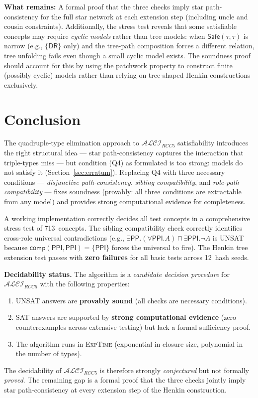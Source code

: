 \documentclass[a4paper,11pt]{article}
\theoremstyle{definition}
\newcommand{\ALCIRCC}[1]{\ensuremath{\mathcal{ALCI}_{\mathit{RCC#1}}}}
\newcommand{\DR}{\ensuremath{\mathsf{DR}}}
\newcommand{\PP}{\ensuremath{\mathsf{PP}}}
\newcommand{\PPI}{\ensuremath{\mathsf{PPI}}}
\newcommand{\comp}{\ensuremath{\mathsf{comp}}}
\newcommand{\Safe}{\ensuremath{\mathsf{Safe}}}
\newcommand{\EXPTIME}{\textsc{ExpTime}}
\begin{document}
\noindent\textbf{What remains:}\; A formal proof that the
three checks imply star path-consistency for the full star
network at each extension step (including uncle and cousin
constraints).  Additionally, the stress test reveals that
some satisfiable concepts may require \emph{cyclic models}
rather than tree models: when $\Safe(\tau, \tau)$ is narrow
(e.g., $\{\DR\}$ only) and the tree-path composition forces
a different relation, tree unfolding fails even though a small
cyclic model exists.  The soundness proof should account for
this by using the patchwork property to construct finite
(possibly cyclic) models rather than relying on tree-shaped
Henkin constructions exclusively.


\section{Conclusion}
\label{sec:conclusion}

The quadruple-type elimination approach to $\ALCIRCC{5}$
satisfiability introduces the right structural idea ---
star path-consistency captures the interaction that triple-types
miss --- but condition (Q4) as formulated is too strong:
models do not satisfy it (Section~\ref{sec:erratum}).
Replacing Q4 with three necessary conditions ---
\emph{disjunctive path-consistency}, \emph{sibling compatibility},
and \emph{role-path compatibility} --- fixes soundness
(provably: all three conditions are extractable from any model)
and provides strong computational evidence for completeness.

A working implementation correctly decides all test concepts in
a comprehensive stress test of 713~concepts.  The sibling
compatibility check correctly identifies cross-role universal
contradictions (e.g., $\exists\PP.(\forall\PPI.A) \sqcap \exists\PPI.\neg A$
is UNSAT because $\comp(\PPI,\PPI) = \{\PPI\}$ forces the universal
to fire).  The Henkin tree extension test passes with
\textbf{zero failures} for all basic tests across 12~hash seeds.

\medskip\noindent\textbf{Decidability status.}\;
The algorithm is a \emph{candidate decision procedure} for
$\ALCIRCC{5}$ with the following properties:
\begin{enumerate}[nosep]
\item UNSAT answers are \textbf{provably sound} (all checks
  are necessary conditions).
\item SAT answers are supported by \textbf{strong computational
  evidence} (zero counterexamples across extensive testing)
  but lack a formal sufficiency proof.
\item The algorithm runs in \EXPTIME{} (exponential in closure
  size, polynomial in the number of types).
\end{enumerate}
The decidability of $\ALCIRCC{5}$ is therefore strongly
\emph{conjectured} but not formally \emph{proved}.
The remaining gap is a formal proof that the three checks
jointly imply star path-consistency at every extension step
of the Henkin construction.
\end{document}
